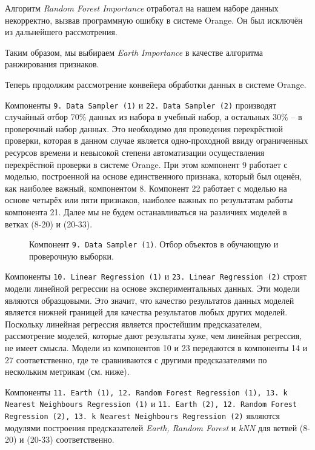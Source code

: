 Алгоритм \textit{Random Forest Importance} отработал на нашем наборе данных некорректно, вызвав программную ошибку в системе Orange. Он был исключён из дальнейшего рассмотрения.

Таким образом, мы выбираем \textit{Earth Importance} в качестве алгоритма ранжирования признаков.

Теперь продолжим рассмотрение конвейера обработки данных в системе Orange.

Компоненты \texttt{9. Data Sampler (1)} и \texttt{22. Data Sampler (2)} производят случайный отбор 70\% данных из набора в учебный набор, а остальных 30\% -- в проверочный набор данных. Это необходимо для проведения перекрёстной проверки, которая в данном случае является одно-проходной ввиду ограниченных ресурсов времени и невысокой степени автоматизации осуществления перекрёстной проверки в системе Orange. При этом компонент 9 работает с моделью, построенной на основе единственного признака, который был оценён, как наиболее важный, компонентом 8. Компонент 22 работает с моделью на основе четырёх или пяти признаков, наиболее важных по результатам работы компонента 21. Далее мы не будем останавливаться на различиях моделей в ветках (8-20) и (20-33).

\begin{figure}[H]
    \caption{Компонент \texttt{9. Data Sampler (1)}. Отбор объектов в обучающую и проверочную выборки.}
    \label{img:9-Data-Sampler-1}
\end{figure}

Компоненты \texttt{10. Linear Regression (1)} и \texttt{23. Linear Regression (2)} строят модели линейной регрессии на основе экспериментальных данных. Эти модели являются образцовыми. Это значит, что качество результатов данных моделей является нижней границей для качества результатов любых других моделей. Поскольку линейная регрессия является простейшим предсказателем, рассмотрение моделей, которые дают результаты хуже, чем линейная регрессия, не имеет смысла. Модели из компонентов 10 и 23 передаются в компоненты 14 и 27 соответственно, где те сравниваются с другими предсказателями по нескольким метрикам (см. ниже).

Компоненты \texttt{11. Earth (1), 12. Random Forest Regression (1), 13. k Nearest Neighbours Regression (1)} и \texttt{11. Earth (2), 12. Random Forest Regression (2), 13. k Nearest Neighbours Regression (2)} являются модулями построения предсказателей \textit{Earth, Random Forest} и \textit{kNN} для ветвей (8-20) и (20-33) соответственно.

